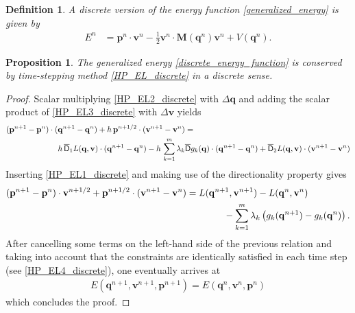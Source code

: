 \documentclass{multibody2023_full_paper}
\newtheorem{definition}[theorem]{Definition}
\newtheorem{proposition}[theorem]{Proposition}
\renewcommand{\vec}[1]{\ensuremath{\mbox{$\mathbf{#1}$}}}
\newcommand{\DG}{\overline{\mathsf{D}}}
\newcommand{\npe}{^{n+1}}
\newcommand{\npeh}{^{n+1/2}}
\newcommand{\n}{^{n}}
\begin{document}
\begin{definition}
    A discrete version of the energy function \eqref{generalized_energy} is given by
    \begin{align} \label{discrete_energy_function}
        E\n & = \vec{p}\n \cdot \vec{v}\n - \frac{1}{2}\vec{v}\n \cdot \vec{M}(\vec{q}\n) \vec{v}\n + V(\vec{q}\n) .
    \end{align}
\end{definition}


\begin{proposition}
    The generalized energy \eqref{discrete_energy_function} is conserved by time-stepping method \eqref{HP_EL_discrete} in a discrete sense.
\end{proposition}

\begin{proof}
    Scalar multiplying \eqref{HP_EL2_discrete} with $\Delta \vec{q}$ and adding the scalar product of \eqref{HP_EL3_discrete} with $\Delta \vec{v}$ yields
    \begin{align}
        (\vec{p}\npe -\vec{p}\n) \cdot (\vec{q}\npe - \vec{q}\n) + h \, \vec{p}\npeh \cdot (\vec{v}\npe - \vec{v}\n)                                                           & =                                                                                                                  \\
        h \, \DG_1 L(\vec{q},\vec{v}) \cdot                                                                           (\vec{q}\npe - \vec{q}\n) - h\, \sum_{k=1}^{m} \lambda_k & \DG g_k(\vec{q}) \cdot (\vec{q}\npe - \vec{q}\n) + \DG_2 L(\vec{q},\vec{v}) \cdot (\vec{v}\npe - \vec{v}\n) \notag
    \end{align}
    Inserting \eqref{HP_EL1_discrete} and making use of the directionality property gives
    \begin{align}
        (\vec{p}\npe -\vec{p}\n) \cdot \vec{v}\npeh + \vec{p}\npeh \cdot (\vec{v}\npe - \vec{v}\n) & = L(\vec{q}\npe,\vec{v}\npe) - L(\vec{q}\n,\vec{v}\n)                                          \\
                                                                                                   & \qquad \qquad - \sum_{k=1}^{m} \lambda_k \left(g_k(\vec{q}\npe)-g_k(\vec{q}\n)\right) . \notag
    \end{align}
    After cancelling some terms on the left-hand side of the previous relation and taking into account that the constraints are identically satisfied in each time step (see \eqref{HP_EL4_discrete}), one eventually arrives at
    \begin{align}
        E(\vec{q}\npe,\vec{v}\npe, \vec{p}\npe) = E(\vec{q}\n,\vec{v}\n, \vec{p}\n)
    \end{align}
    which concludes the proof.
\end{proof}
\end{document}
